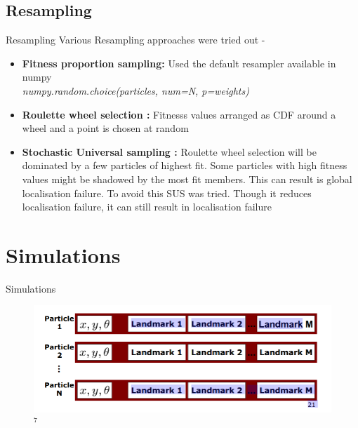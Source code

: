 \documentclass{beamer}
\begin{document}
\subsection{Resampling}
\begin{frame}{Resampling}
    Various Resampling approaches were tried out -
    \begin{itemize}
        \item \textbf{Fitness proportion sampling:} Used the default resampler available in numpy \\
            \textit{numpy.random.choice(particles, num=N, p=weights)}
        \item \textbf{Roulette wheel selection :} Fitnesss values arranged as CDF around a wheel and a point is chosen at random
        \item \textbf{Stochastic Universal sampling :} Roulette wheel selection will be dominated by a few particles of highest fit. Some particles with high fitness values might be shadowed by the most fit members. This can result is global localisation failure. To avoid this SUS was tried. Though it reduces localisation failure, it can still result in localisation failure  
    \end{itemize}
\end{frame}

\section{Simulations}
\begin{frame}{Simulations}
    \begin{figure}
        \centering
        \includegraphics[width=\textwidth]{RBPF_SLAM.png}$^{7}$
    \end{figure}
\end{frame}


\end{document}
